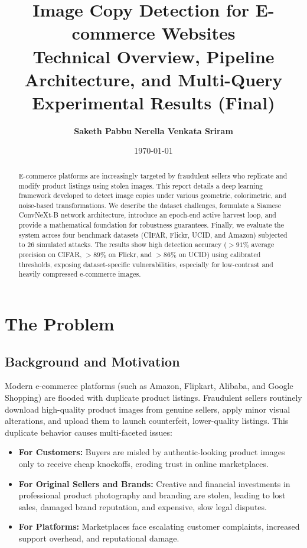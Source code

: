 \documentclass[11pt,a4paper]{article}
\title{\textbf{Image Copy Detection for E-commerce Websites}\\ \large Technical Overview, Pipeline Architecture, and Multi-Query Experimental Results (Final)}
\author{\textbf{Saketh Pabbu} \quad \textbf{Nerella Venkata Sriram}}
\date{\today}
\begin{document}
\maketitle

\begin{abstract}
E-commerce platforms are increasingly targeted by fraudulent sellers who replicate and modify product listings using stolen images. This report details a deep learning framework developed to detect image copies under various geometric, colorimetric, and noise-based transformations. We describe the dataset challenges, formulate a Siamese ConvNeXt-B network architecture, introduce an epoch-end active harvest loop, and provide a mathematical foundation for robustness guarantees. Finally, we evaluate the system across four benchmark datasets (CIFAR, Flickr, UCID, and Amazon) subjected to 26 simulated attacks. The results show high detection accuracy ($>91\%$ average precision on CIFAR, $>89\%$ on Flickr, and $>86\%$ on UCID) using calibrated thresholds, exposing dataset-specific vulnerabilities, especially for low-contrast and heavily compressed e-commerce images.
\end{abstract}

\vspace{0.8cm}
\setcounter{tocdepth}{1}
\tableofcontents
\newpage

\section{The Problem}

\subsection{Background and Motivation}
Modern e-commerce platforms (such as Amazon, Flipkart, Alibaba, and Google Shopping) are flooded with duplicate product listings. Fraudulent sellers routinely download high-quality product images from genuine sellers, apply minor visual alterations, and upload them to launch counterfeit, lower-quality listings. This duplicate behavior causes multi-faceted issues:

\begin{itemize}
    \item \textbf{For Customers:} Buyers are misled by authentic-looking product images only to receive cheap knockoffs, eroding trust in online marketplaces.
    \item \textbf{For Original Sellers and Brands:} Creative and financial investments in professional product photography and branding are stolen, leading to lost sales, damaged brand reputation, and expensive, slow legal disputes.
    \item \textbf{For Platforms:} Marketplaces face escalating customer complaints, increased support overhead, and reputational damage.
\end{itemize}
\end{document}
